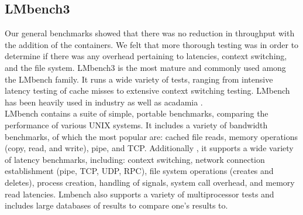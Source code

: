\subsection{LMbench3}
Our general benchmarks showed that there was no reduction in throughput with the addition of the containers.  We felt that more thorough testing was in order to determine if there was any overhead pertaining to latencies, context switching, and the file system.  LMbench3 is the most mature and commonly used among the LMbench family.  It runs a wide variety of tests, ranging from intensive latency testing of cache misses to extensive context switching testing.  LMbench has been heavily used in industry as well as acadamia \cite{lmbench}. \\

LMbench contains a suite of simple, portable benchmarks, comparing the performance of various UNIX systems.  It includes a variety of bandwidth benchmarks, of which the most popular are: cached file reads, memory operations (copy, read, and write), pipe, and TCP.  Additionally , it supports a wide variety of latency benchmarks, including: context switching, network connection establishment (pipe, TCP, UDP, RPC), file system operations (creates and deletes), process creation, handling of signals, system call overhead, and memory read latencies.  Lmbench also supports a variety of multiprocessor tests and includes large databases of results to compare one's results to. \cite{lmbench_paper}
